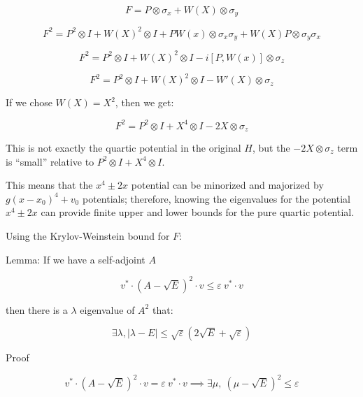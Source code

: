 \documentclass{article}
\theoremstyle{definition}
\begin{document}
\begin{equation}
    F=P\otimes \sigma_x + W(X) \otimes \sigma_y
\end{equation}

\begin{equation}
    F^2 = P^2 \otimes I + W(X)^2 \otimes I + P W(x) \otimes \sigma_x \sigma_y + W(X) P \otimes \sigma_y \sigma_x
\end{equation}

\begin{equation}
    F^2 = P^2 \otimes I + W(X)^2 \otimes I - i [P, W(x)] \otimes \sigma_z
\end{equation}

\begin{equation}
    F^2 = P^2 \otimes I + W(X)^2 \otimes I - W'(X) \otimes \sigma_z
\end{equation}

If we chose $W(X)=X^2$, then we get:

\begin{equation}
    F^2 = P^2 \otimes I +X^4 \otimes I - 2 X \otimes \sigma_z
\end{equation}

This is not exactly the quartic potential in the original $H$, but the $ -2 X \otimes \sigma_z$ term is ``small'' relative to $P^2 \otimes I + X^4 \otimes I$.

This means that the $x^4 \pm 2x$ potential can be minorized and majorized by $g (x-x_0)^4+v_0$ potentials; therefore, knowing the eigenvalues for the potential $x^4 \pm 2x$ can provide finite upper and lower bounds for the pure quartic potential.

Using the Krylov-Weinstein bound for $F$:

Lemma:
If we have a self-adjoint $A$

\begin{equation}
    v^* \cdot (A-\sqrt{E})^2 \cdot v \le \varepsilon \ v^* \cdot v
\end{equation}

then there is a $\lambda$ eigenvalue of $A^2$ that:

\begin{equation}
    \exists \lambda, |\lambda-E|\le \sqrt{\varepsilon} (2\sqrt{E}+\sqrt{\varepsilon})
\end{equation}

Proof

\begin{equation}
    v^* \cdot (A-\sqrt{E})^2 \cdot v = \varepsilon \ v^* \cdot v
    \implies
    \exists \mu, \ (\mu-\sqrt{E})^2 \le \varepsilon
\end{equation}
\end{document}
